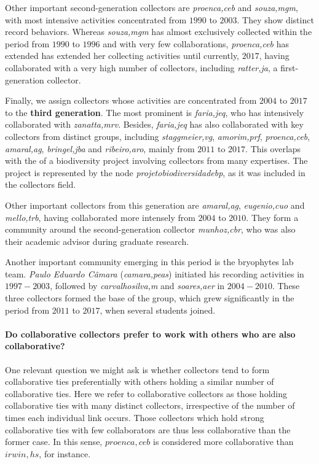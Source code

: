 Other important second-generation collectors are \textit{proenca,ceb} and \textit{souza,mgm}, with most intensive activities concentrated from $1990$ to $2003$.
They show distinct record behaviors.
Whereas \textit{souza,mgm} has almost exclusively collected within the period from $1990$ to $1996$ and with very few collaborations, \textit{proenca,ceb} has extended has extended her collecting activities until currently, $2017$, having collaborated with a very high number of collectors, including \textit{ratter,ja}, a first-generation collector.

Finally, we assign collectors whose activities are concentrated from $2004$ to $2017$ to the \textbf{third generation}.
The most prominent is \textit{faria,jeq}, who has intensively collaborated with \textit{zanatta,mrv}.
Besides, \textit{faria,jeq} has also collaborated with key collectors from distinct groups, including \textit{staggmeier,vg}, \textit{amorim,prf}, \textit{proenca,ceb}, \textit{amaral,ag}, \textit{bringel,jba} and \textit{ribeiro,aro}, mainly from $2011$ to $2017$.
This overlaps with the of a biodiversity project involving collectors from many expertises.
The project is represented by the node \textit{projetobiodiversidadebp}, as it was included in the collectors field. 

Other important collectors from this generation are \textit{amaral,ag}, \textit{eugenio,cuo} and \textit{mello,trb}, having collaborated more intensely from $2004$ to $2010$. They form a community around the second-generation collector \textit{munhoz,cbr}, who was also their academic advisor during graduate research.

Another important community emerging in this period is the bryophytes lab team. 
\textit{Paulo Eduardo Câmara} (\textit{camara,peas}) initiated his recording activities in $1997-2003$, followed by \textit{carvalhosilva,m} and \textit{soares,aer} in $2004-2010$. These three collectors formed the base of the group, which grew significantly in the period from $2011$ to $2017$, when several students joined. 


\paragraph*{Do collaborative collectors prefer to work with others who are also collaborative?}
One relevant question we might ask is whether collectors tend to form collaborative ties preferentially with others holding a similar number of collaborative ties.
Here we refer to collaborative collectors as those holding collaborative ties with many distinct collectors, irrespective of the number of times each individual link occurs. Those collectors which hold strong collaborative ties with few collaborators are thus less collaborative than the former case. In this sense, $proenca,ceb$ is considered more collaborative than $irwin,hs$, for instance.

